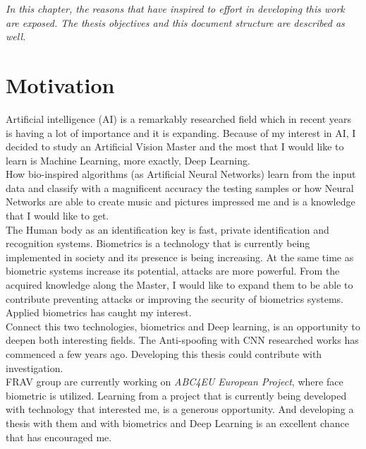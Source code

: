 
\begin{small}
\emph{In this chapter, the reasons that have inspired to effort in developing this work are exposed. The thesis objectives and this document structure are described as well.\\}
\end{small}
\section{Motivation}
Artificial intelligence (AI) is a remarkably researched field which in recent years is having a lot of importance and it is expanding. Because of my interest in AI,  I decided to study an Artificial Vision Master and the most that I would like to learn is Machine Learning, more exactly, Deep Learning.\\

How bio-inspired algorithms (as Artificial Neural Networks) learn from the input data and classify with a magnificent accuracy the testing samples or how Neural Networks are able to create music and pictures impressed me and is a knowledge that I would like to get.\\

The Human body as an identification key is fast, private identification and recognition systems. Biometrics is a technology that is currently being implemented in society and its presence is being increasing. At the same time as biometric systems increase its potential, attacks are more powerful. From the acquired knowledge along the Master, I would like to expand them to be able to contribute preventing attacks or improving the security of biometrics systems. Applied biometrics has caught my interest. \\

Connect this two technologies, biometrics and Deep learning, is an opportunity to deepen both interesting fields. The Anti-spoofing with CNN researched works has commenced a few years ago. Developing this thesis could contribute with investigation.\\

FRAV group are currently working on \textit{ABC4EU European Project}, where face biometric is utilized. Learning from a project that is currently being developed with technology that interested me, is a generous opportunity. And developing a thesis with them and with biometrics and Deep Learning is an excellent chance that has encouraged me.\\

